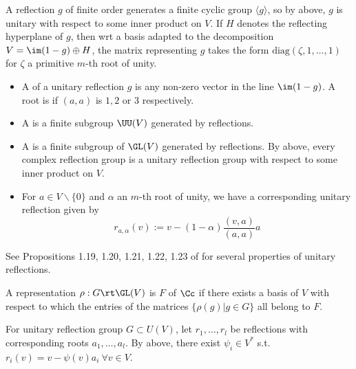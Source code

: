 \nt A reflection $g$ of finite order generates a finite cyclic group $\langle g \rangle$, so by above, $g$ is unitary with respect to some inner product on $V$. If $H$ denotes the reflecting hyperplane of $g$, then wrt a basis adapted to the decomposition $V=\im(1-g)\oplus H$, the matrix representing $g$ takes the form $\text{diag}(\zeta,1,\dots,1)$ for $\zeta$ a primitive $m$-th root of unity.

\begin{definition}\begin{itemize}
  \item A  of a unitary reflection $g$ is any non-zero vector in the line $\im(1-g)$. A root is  if $(a,a)$ is $1,2$ or $3$ respectively. 
  
  \item A  is a finite subgroup $\UU(V)$ generated by reflections. 
  
  \item A  is a finite subgroup of $\GL(V)$ generated by reflections. By above, every complex reflection group is a unitary reflection group with respect to some inner product on $V$.
  
  \item For $a\in V\backslash\{0\}$ and $\alpha$ an $m$-th root of unity, we have a corresponding unitary reflection given by 
  $$r_{a,\alpha}(v):=v-(1-\alpha)\frac{(v,a)}{(a,a)}a$$
\end{itemize}
\end{definition}

\nt See Propositions 1.19, 1.20, 1.21, 1.22, 1.23 of \cite{alma9930780234401631} for several properties of unitary reflections.

\begin{definition}\label{definable} A representation $\rho:G\rt \GL(V)$ is  $F$ of $\Cc$ if there exists a basis of $V$ with respect to which the entries of the matrices $\{\rho(g)|g\in G\}$ all belong to $F$.
\end{definition}

\nt For unitary reflection group $G\subset U(V)$, let $r_1,\dots,r_l$ be reflections with corresponding roots $a_1,\dots,a_l$. By above, there exist $\psi_i\in V^*$ s.t. $r_i(v)=v-\psi(v)a_i\ \forall v\in V$.

